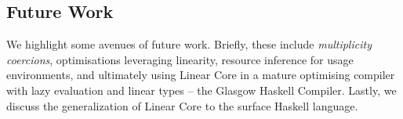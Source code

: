 \documentclass[acmsmall,review,anonymous]{acmart}
\newcommand{\parawith}[1]{\paragraph{\emph{#1}}}
\begin{document}
% 

% 

\subsection{Future Work\label{sec:future-work}}

We highlight some avenues of future work. Briefly,
these include \emph{multiplicity coercions}, optimisations leveraging
linearity, resource inference for usage environments, and ultimately using
Linear Core in a mature optimising compiler with lazy evaluation and linear
types -- the Glasgow Haskell Compiler. Lastly, we discuss the
generalization of Linear Core to the surface Haskell language.
\end{document}

